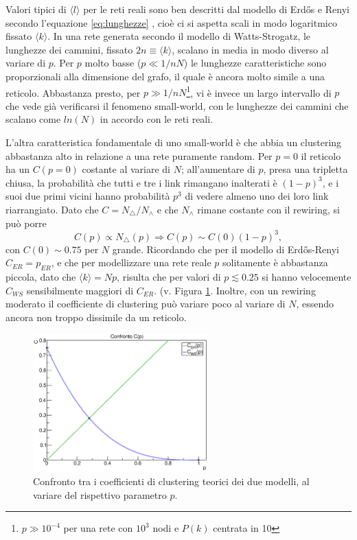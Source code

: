 Valori tipici di $\langle l \rangle$ per le reti reali sono ben descritti dal modello di Erdős e Renyi secondo l'equazione \ref{eq:lunghezze} \parencite{Barbalbert2002}, cioè ci si aspetta scali in modo logaritmico fissato $\langle k \rangle$. In una rete generata secondo il modello di Watts-Strogatz, le lunghezze dei cammini, fissato $2n \equiv \langle k \rangle$, scalano in media in modo diverso al variare di $p$. Per $p$ molto basse ($p \ll 1/nN$) le lunghezze caratteristiche sono proporzionali alla dimensione del grafo, il quale è ancora molto simile a una reticolo. Abbastanza presto, per $p \gg 1/nN$\footnote{$p \gg 10^{-4}$ per una rete con $10^3$ nodi e $P(k)$ centrata in 10}, vi è invece un largo intervallo di $p$ che vede già verificarsi il fenomeno small-world, con le lunghezze dei cammini che scalano come $ln(N)$ in accordo con le reti reali.

L'altra caratteristica fondamentale di uno small-world è che abbia un clustering abbastanza alto in relazione a una rete puramente random. Per $p = 0$ il reticolo ha un $C(p = 0)$ costante al variare di $N$; all'aumentare di $p$, presa una tripletta chiusa, la probabilità che tutti e tre i link rimangano inalterati è $(1-p)^3$, e i suoi due primi vicini hanno probabilità $p^3$ di vedere almeno uno dei loro link riarrangiato. Dato che $C=N_\triangle/N_\wedge$ e che $N_\wedge$ rimane costante con il rewiring, si può porre 
$$C(p) \propto N_\triangle (p) \Rightarrow C(p) \sim C(0)(1-p)^3, $$
con $C(0) \sim 0.75$ per $N$ grande. Ricordando che per il modello di Erdős-Renyi $C_{ER}=p_{ER}$, e che per modellizzare una rete reale $p$ solitamente è abbastanza piccola, dato che $\langle k \rangle = Np$, risulta che per valori di $p \lesssim 0.25$ si hanno velocemente $C_{WS}$ sensibilmente maggiori di $C_{ER}$. (v. Figura \ref{fig:confrontoC}. Inoltre, con un rewiring moderato il coefficiente di clustering può variare poco al variare di $N$, essendo ancora non troppo dissimile da un reticolo.

\begin{figure}[t!]
	\centering
	\includegraphics[width=0.6\textwidth]{./Immagini/Teoria/confrontoC}
	\caption[Confronto clustering.]{Confronto tra i coefficienti di clustering teorici dei due modelli, al variare del rispettivo parametro $p$.}
	\label{fig:confrontoC}
\end{figure}

